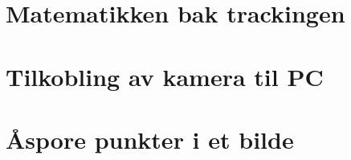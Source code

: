 \section{Matematikken bak trackingen}

	

\section{Tilkobling av kamera til PC}

	

\section{\AA spore punkter i et bilde}

	